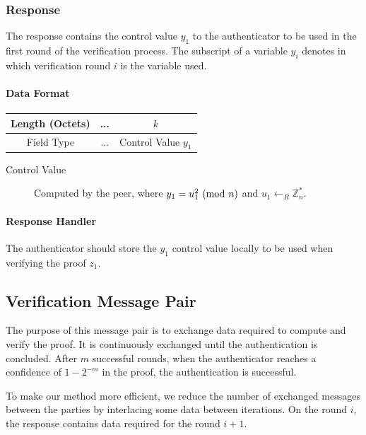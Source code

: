 \subsubsection{Response}
The response contains the control value $y_1$ to the authenticator to be used in the first round of the verification process.
The subscript of a variable $y_i$ denotes in which verification round $i$ is the variable used.

\paragraph{Data Format}

\begin{center}
\begin{tabular}{|c|c|c|}
	\hline
	Length (Octets) & ... & $k$ \\
	\hline
	Field Type & ... & Control Value $y_1$\\
	\hline
\end{tabular}
\end{center}

\bigskip

\begin{description}
	\item[Control Value] Computed by the peer, where $y_1 = u_1^2 \ (\mathrm{mod}\ n)$ and $u_1 \leftarrow_R \mathbb{Z}^*_n$.
\end{description}

\paragraph{Response Handler}
The authenticator should store the $y_1$ control value locally to be used when verifying the proof $z_1$.

\subsection{Verification Message Pair}
The purpose of this message pair is to exchange data required to compute and verify the proof.
It is continuously exchanged until the authentication is concluded.
After $m$ successful rounds, when the authenticator reaches a confidence of $1 - 2^{-m}$ in the proof, the authentication is successful.

To make our method more efficient, we reduce the number of exchanged messages between the parties by interlacing some data between iterations.
On the round $i$, the response contains data required for the round $i+1$.



